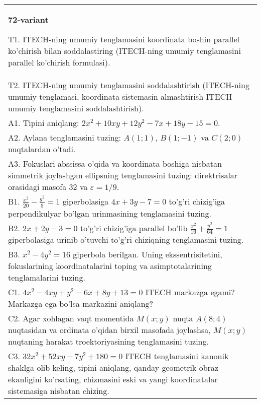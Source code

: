 \documentclass{article}
\begin{document}
\begin{tabular}{m{17cm}}
\textbf{72-variant}
\newline

T1. ITECH-ning umumiy tenglamasini koordinata boshin parallel ko'chirish bilan soddalastiring (ITECH-ning umumiy tenglamasini parallel ko'chirish formulasi).\\

T2. ITECH-ning umumiy tenglamasini soddalashtirish (ITECH-ning umumiy tenglamasi, koordinata sistemasin almashtirish ITECH umumiy tenglamasini soddalashtirish).\\

A1. Tipini aniqlang: $2x^{2}+10xy+12y^{2}-7x+18y-15=0$.\\

A2. Aylana tenglamasini tuzing: $A(1;1)$, $B(1;-1)$ va $C(2;0)$ nuqtalardan o'tadi.\\

A3. Fokuslari abssissa o'qida va koordinata boshiga nisbatan simmetrik joylashgan ellipsning tenglamasini tuzing: direktrisalar orasidagi masofa $32$ va $\varepsilon=1/9$.\\

B1. $\frac{x^{2}}{20} - \frac{y^{2}}{5} = 1$ giperbolasiga $4x + 3y - 7 = 0$ to'g'ri chizig'iga perpendikulyar bo'lgan urinmasining tenglamasini tuzing.  \\

B2. $2x + 2y - 3 = 0$ to'g'ri chizig'iga parallel bo'lib $\frac{x^{2}}{16} + \frac{y^{2}}{64} = 1$ giperbolasiga urinib o'tuvchi to'g'ri chiziqning tenglamasini tuzing.  \\

B3. $x^{2} - 4y^{2} = 16$ giperbola berilgan. Uning ekssentrisitetini, fokuslarining koordinatalarini toping va asimptotalarining tenglamalarini tuzing.\\

C1. $4x^{2} - 4xy + y^{2} - 6x + 8y + 13 = 0$ ITECH markazga egami? Markazga ega bo'lsa markazini aniqlang?  \\

C2. Agar xohlagan vaqt momentida $M(x;y)$ nuqta $A(8;4)$ nuqtasidan va ordinata o'qidan birxil masofada joylashsa, $M(x;y)$ nuqtaning harakat troektoriyasining tenglamasini tuzing.  \\

C3. $32x^{2} + 52xy - 7y^{2} + 180 = 0$ ITECH tenglamasini kanonik shaklga olib keling, tipini aniqlang, qanday geometrik obraz ekanligini ko'rsating, chizmasini eski va yangi koordinatalar sistemasiga nisbatan chizing.  \\

\end{tabular}
\vspace{1cm}
\end{document}
